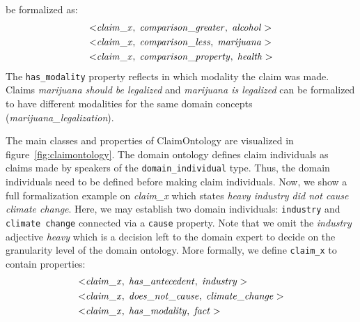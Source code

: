 be formalized as:
\begin{align*}
	< & \mathit{claim\_x}, \hspace{0.1cm} \mathit{comparison\_greater}, \hspace{0.1cm}
	\mathit{alcohol} > \\
	< & \mathit{claim\_x}, \hspace{0.1cm} \mathit{comparison\_less}, \hspace{0.1cm}
	\mathit{marijuana} >  \\
	< & \mathit{claim\_x}, \hspace{0.1cm} \mathit{comparison\_property}, \hspace{0.1cm}
	\mathit{health} > 
\end{align*}
The \texttt{has\_modality} property reflects in which modality the claim was made. 
Claims \emph{marijuana should be legalized} and \emph{marijuana is legalized} 
can be formalized to have different modalities for the same domain concepts
(\emph{marijuana\_legalization}). 

The main classes and properties of ClaimOntology are visualized in 
figure~\ref{fig:claimontology}. The domain ontology defines 
claim individuals as claims made by speakers of the
\texttt{domain\_individual} type. Thus, the domain individuals need to be
defined before making claim individuals. Now, we show a full formalization 
example on \emph{claim\_x} which states
\emph{heavy industry did not cause climate change}. Here, we may establish
two domain individuals: \texttt{industry} and \texttt{climate change}
connected via a \texttt{cause} property. Note that we omit the \emph{industry}
adjective \emph{heavy} which is a decision left to the domain expert to decide
on the granularity level of the domain ontology. 
More formally, we define \texttt{claim\_x} to contain properties:
\begin{align*}
	< & \mathit{claim\_x}, \hspace{0.1cm} \mathit{has\_antecedent}, \hspace{0.1cm}
	\mathit{industry} > \\
	< & \mathit{claim\_x}, \hspace{0.1cm} \mathit{does\_not\_cause}, \hspace{0.1cm}
	\mathit{climate\_change} >  \\
	< & \mathit{claim\_x}, \hspace{0.1cm} \mathit{has\_modality}, \hspace{0.1cm}
	\mathit{fact} > 
\end{align*}

